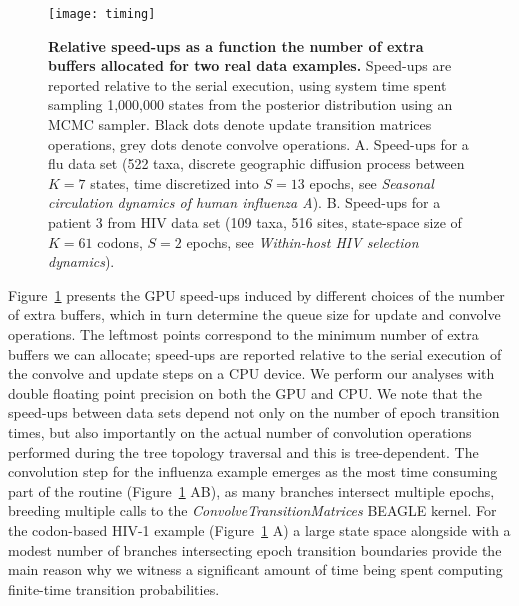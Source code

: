 \begin{figure}[h!]
\centering
\texttt{[image: timing]} 
\caption{
{\footnotesize 
{\bf Relative speed-ups as a function the number of extra buffers allocated for two real data examples.}
Speed-ups are reported relative to the serial execution, using system time spent sampling 1,000,000 states from the posterior distribution using an MCMC sampler. 
Black dots denote update transition matrices operations, grey dots denote convolve operations.
A. Speed-ups for a flu data set (522 taxa, discrete geographic diffusion process between $K=7$ states, time discretized into $S=13$ epochs, see {\it{Seasonal circulation dynamics of human influenza A}}). 
B. Speed-ups for a patient 3 from HIV data set (109 taxa, 516 sites, state-space size of $K=61$ codons, $S=2$ epochs, see {\it{Within-host HIV selection dynamics}}). 
} %
}
\label{fig:StackSizeTiming}
\end{figure}

Figure~\ref{fig:StackSizeTiming} presents the GPU speed-ups induced by different choices of the number of extra buffers, which in turn determine the queue size for update and convolve operations. 
The leftmost points correspond to the minimum number of extra buffers we can allocate; speed-ups are reported relative to the serial execution of the convolve and update steps on a CPU device. We perform our analyses with double floating point precision on both the GPU and CPU.
We note that the speed-ups between data sets depend not only on the number of epoch transition times, but also importantly on the actual number of convolution operations performed during the tree topology traversal and this is tree-dependent. 
The convolution step for the influenza example emerges as the most time consuming part of the routine (Figure~\ref{fig:StackSizeTiming} AB), as many branches intersect multiple epochs, breeding multiple calls to the \emph{ConvolveTransitionMatrices} BEAGLE kernel.  
For the codon-based HIV-1 example (Figure~\ref{fig:StackSizeTiming} A) a large state space alongside with a modest number of branches intersecting epoch transition boundaries provide the main reason why we witness a significant amount of time being spent computing finite-time transition probabilities. 


